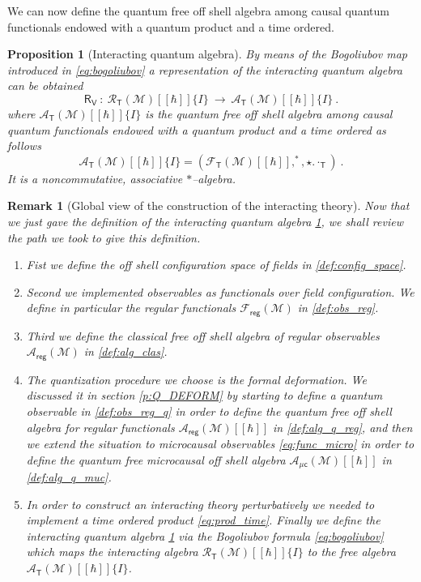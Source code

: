 \documentclass[11pt]{book}
\newcommand{\reg}{\mathsf{reg}}
\newcommand{\muc}{\mu\csf}
\newcommand{\Acal}{\mathcal{A}}
\newcommand{\Fcal}{\mathcal{F}}
\newcommand{\Mcal}{\mathcal{M}}
\newcommand{\Rcal}{\mathcal{R}}
\newcommand{\Rsf}{\mathsf{R}}
\newcommand{\Tsf}{\mathsf{T}}
\newcommand{\Vsf}{\mathsf{V}}
\newcommand{\csf}{\mathsf{c}}
\theoremstyle{break}
\newtheorem{proposition}{Proposition}[chapter]
\newtheorem{remark}{Remark}[chapter]
\begin{document}
\bigskip


We can now define the quantum free off shell algebra among causal quantum functionals endowed with a quantum product and a time ordered. 


\begin{proposition}[Interacting quantum algebra]\label{prop:alg_int}
By means of the Bogoliubov map  introduced in \eqref{eq:bogoliubov} a representation of the interacting quantum algebra can be obtained 
%
\begin{equation}
\Rsf_\Vsf \ : \ \Rcal_\Tsf(\Mcal)[[\hbar]]\{I\} \ \to \ \Acal_\Tsf(\Mcal)[[\hbar]]\{I\} \ .
\label{eq:alg_int}
\end{equation}
%
where $\Acal_\Tsf(\Mcal)[[\hbar]]\{I\}$ is the quantum free off shell algebra among causal quantum functionals endowed with a quantum product and a time ordered as follows
%
\begin{equation*}
\Acal_\Tsf(\Mcal)[[\hbar]]\{I\} = \left(\Fcal_\Tsf(\Mcal)[[\hbar]] , ^\ast , \star . \cdot_\Tsf \right) \ . 
\end{equation*}
%
It is a noncommutative, associative $\ast$--algebra.
\end{proposition}



\begin{remark}[Global view of the construction of the interacting theory]
Now that we just gave the definition of the interacting quantum algebra \ref{prop:alg_int}, we shall review the path we took to give this definition.
%
\begin{enumerate}
\item Fist we define the off shell configuration space of fields in \ref{def:config_space}.
%
\item Second we implemented observables as functionals over field configuration. We define in particular the regular functionals $\Fcal_\reg(\Mcal)$ in \ref{def:obs_reg}.
%
\item Third we define the classical free off shell algebra of regular observables $\Acal_\reg(\Mcal)$ in \ref{def:alg_clas}.
%
\item The quantization procedure we choose is the formal deformation. We discussed it in section \ref{p:Q_DEFORM} by starting to define a quantum observable in \ref{def:obs_reg_q} in order to define the quantum free off shell algebra for regular functionals $\Acal_\reg(\Mcal)[[\hbar]]$ in \ref{def:alg_q_reg}, and then we extend the situation to microcausal observables \eqref{eq:func_micro} in order to define the quantum free microcausal off shell algebra $\Acal_{\muc}(\Mcal)[[\hbar]]$ in \ref{def:alg_q_muc}.
%
\item In order to construct an interacting theory perturbatively we needed to implement a time ordered product \eqref{eq:prod_time}. Finally we define the interacting quantum algebra \ref{prop:alg_int} via the Bogoliubov formula \eqref{eq:bogoliubov} which maps the interacting algebra $\Rcal_\Tsf(\Mcal)[[\hbar]]\{I\}$ to the free algebra $\Acal_\Tsf(\Mcal)[[\hbar]]\{I\} $.
%
\end{enumerate}
\end{remark}
\end{document}
